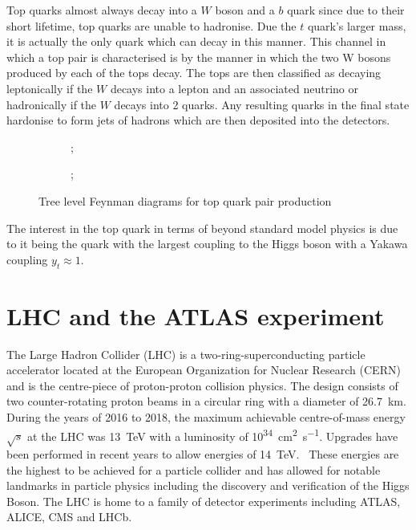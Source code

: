 \documentclass[a4paper,11pt]{article}
\begin{document}
Top quarks almost always decay into a $W$ boson and a $b$ quark since due to their short lifetime, top quarks are unable to hadronise.
Due the $t$ quark's larger mass, it is actually the only quark which can decay in this manner.
This channel in which a top pair is characterised is by the manner in which the two W bosons produced by each of the tops decay.
The tops are then classified as decaying leptonically if the $W$ decays into a lepton and an associated neutrino or hadronically if the $W$ decays into 2 quarks.
Any resulting quarks in the final state hardonise to form jets of hadrons which are then deposited into the detectors.

\begin{figure}[htb]
    \centering
    \begin{subfigure}[b]{0.4\textwidth}
        \centering
        ;
    \end{subfigure}
    \hfill
    \begin{subfigure}[b]{0.4\textwidth}
        \centering
        ;
    \end{subfigure}
    \caption{Tree level Feynman diagrams for top quark pair production}
\end{figure}


\nocite{Thomson:2013zua}
The interest in the top quark in terms of beyond standard model physics is due to it being the quark with the largest coupling to the Higgs boson with a Yakawa coupling $y_{t} \approx 1$.

\section{LHC and the ATLAS experiment}
The Large Hadron Collider (LHC) is a two-ring-superconducting particle accelerator located at the European Organization for Nuclear Research (CERN) and is the centre-piece of proton-proton collision physics.
The design consists of two counter-rotating proton beams in a circular ring with a diameter of \SI{26.7}{\kilo\metre}.
During the years of 2016 to 2018, the maximum achievable centre-of-mass energy $\sqrt{s}$ at the LHC was \SI{13}{\tera\electronvolt} with a luminosity of \si{10^{34}\centi\metre\squared\per\second}.
Upgrades have been performed in recent years to allow energies of \SI{14}{\tera\electronvolt}.~\nocite{Evans:2008zzb}
These energies are the highest to be achieved for a particle collider and has allowed for notable landmarks in particle physics including the discovery and verification of the Higgs Boson.
The LHC is home to a family of detector experiments including ATLAS, ALICE, CMS and LHCb.
\end{document}
